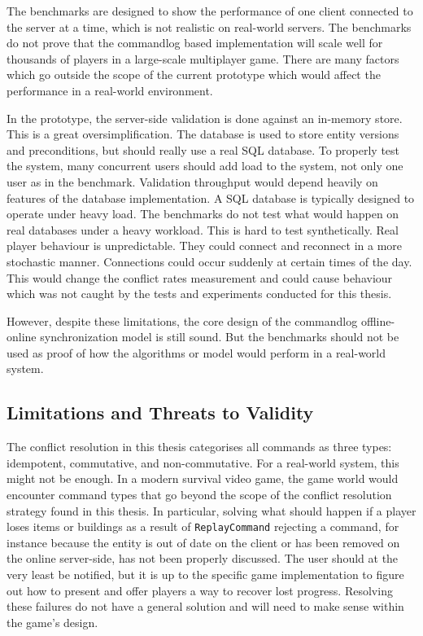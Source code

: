 \documentclass{article}
\begin{document}
The benchmarks are designed to show the performance of one client connected to the server at a time, which is not realistic on real-world servers. The benchmarks do not prove that the commandlog based implementation will scale well for thousands of players in a large-scale multiplayer game. There are many factors which go outside the scope of the current prototype which would affect the performance in a real-world environment.

In the prototype, the server-side validation is done against an in-memory store. This is a great oversimplification. The database is used to store entity versions and preconditions, but should really use a real SQL database. To properly test the system, many concurrent users should add load to the system, not only one user as in the benchmark. Validation throughput would depend heavily on features of the database implementation. A SQL database is typically designed to operate under heavy load. The benchmarks do not test what would happen on real databases under a heavy workload. This is hard to test synthetically. Real player behaviour is unpredictable. They could connect and reconnect in a more stochastic manner. Connections could occur suddenly at certain times of the day. This would change the conflict rates measurement and could cause behaviour which was not caught by the tests and experiments conducted for this thesis.

However, despite these limitations, the core design of the commandlog offline-online synchronization model is still sound. But the benchmarks should not be used as proof of how the algorithms or model would perform in a real-world system.

\subsection{Limitations and Threats to Validity}

The conflict resolution in this thesis categorises all commands as three types: idempotent, commutative, and non-commutative. For a real-world system, this might not be enough. In a modern survival video game, the game world would encounter command types that go beyond the scope of the conflict resolution strategy found in this thesis. In particular, solving what should happen if a player loses items or buildings as a result of \texttt{ReplayCommand} rejecting a command, for instance because the entity is out of date on the client or has been removed on the online server-side, has not been properly discussed. The user should at the very least be notified, but it is up to the specific game implementation to figure out how to present and offer players a way to recover lost progress. Resolving these failures do not have a general solution and will need to make sense within the game's design.
\end{document}
